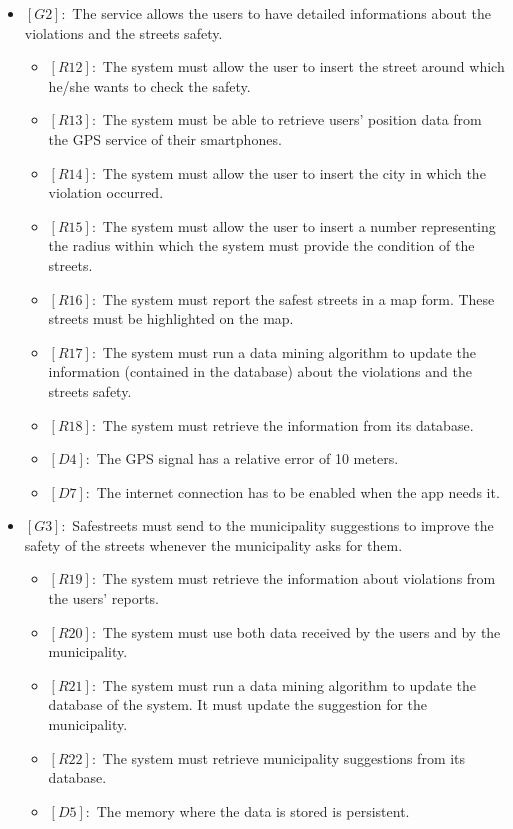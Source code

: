 \documentclass[titlepage]{article}
\begin{document}
\begin{itemize}
\begin{itemize}
 	
 \end{itemize}
 \item $[G2]:$ The service allows the users to have detailed informations about the violations and the streets safety.
 \begin{itemize}
 	\item $[R12]:$ The system must allow the user to insert the street around which he/she wants to check the safety.
 	\item $[R13]:$ The system must be able to retrieve users' position data from the GPS service of their smartphones.
 	\item $[R14]:$ The system must allow the user to insert the city in which the violation occurred.
 	\item $[R15]:$ The system must allow the user to insert a number representing the radius within which the system must provide the condition of the streets.
 	\item $[R16]:$ The system must report the  safest streets in a map form. These streets must be highlighted on the map.
 	\item $[R17]:$ The system must run a data mining algorithm to update the information (contained in the database) about the violations and the streets safety.
 	\item $[R18]:$ The system must retrieve the information from its database.
 	\item $[D4]:$ The GPS signal has a relative error of 10 meters.
 	\item $[D7]:$ The internet connection has to be enabled when the app needs it.
 \end{itemize}
 
 
 
 \item $[G3]:$ Safestreets must send to the municipality suggestions to improve the safety of the streets whenever the municipality asks for them.
 \begin{itemize}
 \item $[R19]:$ The system must retrieve the information about violations from the users' reports.
 \item $[R20]:$ The system must use both data received by the users and by the municipality.
 \item $[R21]:$ The system must run a data mining algorithm to update the database of the system. It must update the suggestion for the municipality.
 \item $[R22]:$ The system must retrieve municipality suggestions from its database.
 \item $[D5]:$ The memory where the data is stored is persistent.
 \end{itemize}
 

\end{itemize}
\end{document}
